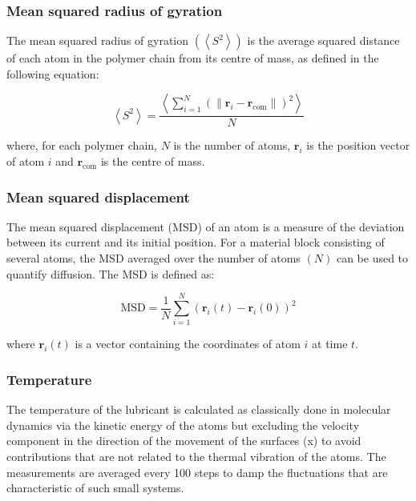 \documentclass[aps,prb,reprint,superscriptaddress, a4paper]{revtex4-1}
\begin{document}
\subsubsection{Mean squared radius of gyration}

The mean squared radius of gyration $\left(\left< S^2 \right>\right)$  is the average squared distance of each atom in the polymer chain  from its centre of mass, as defined in the following equation\cite{Brown1994}:

\begin{equation}
	\left< S^2 \right> = \frac{\left< \sum_{i=1}^{N}  \left ( \lVert \mathbf{r}_i - \mathbf{r}_{\text{com}} \rVert \right)^2 \right>}{N}
\end{equation}

where, for each polymer chain,  $N$ is the number of atoms, $ \mathbf{r}_i$ is the position vector of atom $i$  and $\mathbf{r}_{\text{com}}$ is the centre of mass. 


\subsubsection{Mean squared displacement}

The mean squared displacement (MSD) of an atom  is a measure of the deviation between its  current  and its initial position. For a material block consisting of several atoms, the  MSD averaged over the number of atoms  $\left(N\right)$ can be used to quantify  diffusion. The MSD is defined as:

\begin{equation}
	\text{MSD} = \frac{1}{N}\sum_{i=1}^{N} \left( \mathbf{r}_i\left(t\right)-\mathbf{r}_i\left(0\right)\right)^2
\end{equation}

where   $\mathbf{r}_i\left(t\right)$ is a vector containing the coordinates of atom $i$ at time $t$.



\subsubsection{Temperature}

The temperature of the lubricant is calculated as classically done in molecular dynamics via the kinetic energy of the atoms but excluding the velocity component in the direction of the movement of the surfaces (x) to avoid contributions that are not related to the thermal vibration of the atoms. The measurements are averaged every 100 steps to damp the fluctuations that are  characteristic of such small systems.
\end{document}
